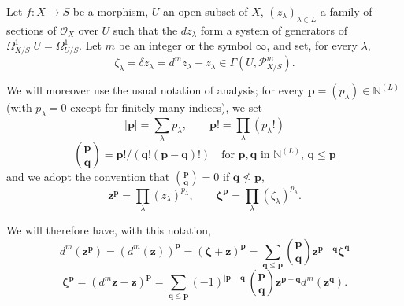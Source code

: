 \begin{env}[16.11.1]
\label{IV.16.11.1}
Let $f:X\to S$ be a morphism, $U$ an open subset of $X$,
$(z_\lambda)_{\lambda\in L}$ a family of sections of $\mathcal{O}_X$
over $U$ such that the $dz_\lambda$ form a system of generators
of $\Omega_{X/S}^1|U=\Omega_{U/S}^1$. Let $m$ be an integer or the symbol
$\infty$, and set, for every $\lambda$,
\[
  \zeta_\lambda=\delta z_\lambda=d^m z_\lambda-z_\lambda
  \in\Gamma(U,\mathscr{P}_{X/S}^m).
  \tag{16.11.1.1}
  \label{IV.16.11.1.1}
\]

We will moreover use the usual notation of analysis; for every
$\mathbf{p}=(p_\lambda)\in\mathbb{N}^{(L)}$ (with $p_\lambda=0$ except for
finitely many indices), we set
\[
  |\mathbf{p}|=\sum_\lambda p_\lambda,
  \qquad \mathbf{p}!=\prod_\lambda(p_\lambda!)
  \tag{16.11.1.2}
  \label{IV.16.11.1.2}
\]
\[
  \binom{\mathbf{p}}{\mathbf{q}}
  =\mathbf{p}!/(\mathbf{q}!(\mathbf{p}-\mathbf{q})!)
  \quad\text{for $\mathbf{p},\mathbf{q}$ in $\mathbb{N}^{(L)}$,
  $\mathbf{q}\leq\mathbf{p}$}
  \tag{16.11.1.3}
  \label{IV.16.11.1.3}
\]
and we adopt the convention that $\binom{\mathbf{p}}{\mathbf{q}}=0$ if
$\mathbf{q}\nleq\mathbf{p}$,
\[
  \mathbf{z}^{\mathbf{p}}=\prod_\lambda(z_\lambda)^{p_\lambda},
  \qquad
  \boldsymbol{\zeta}^{\mathbf{p}}=\prod_\lambda(\zeta_\lambda)^{p_\lambda}.
  \tag{16.11.1.4}
  \label{IV.16.11.1.4}
\]

We will therefore have, with this notation,
\[
  d^m(\mathbf{z}^{\mathbf{p}})
  =(d^m(\mathbf{z}))^{\mathbf{p}}
  =(\boldsymbol{\zeta}+\mathbf{z})^{\mathbf{p}}
  =\sum_{\mathbf{q}\leq\mathbf{p}}
    \binom{\mathbf{p}}{\mathbf{q}}
    \mathbf{z}^{\mathbf{p}-\mathbf{q}}\boldsymbol{\zeta}^{\mathbf{q}}
  \tag{16.11.1.5}
  \label{IV.16.11.1.5}
\]
\[
  \boldsymbol{\zeta}^{\mathbf{p}}
  =(d^m\mathbf{z}-\mathbf{z})^{\mathbf{p}}
  =\sum_{\mathbf{q}\leq\mathbf{p}}
    (-1)^{|\mathbf{p}-\mathbf{q}|}
    \binom{\mathbf{p}}{\mathbf{q}}
    \mathbf{z}^{\mathbf{p}-\mathbf{q}}d^m(\mathbf{z}^{\mathbf{q}}).
  \tag{16.11.1.6}
  \label{IV.16.11.1.6}
\]


\end{env}
